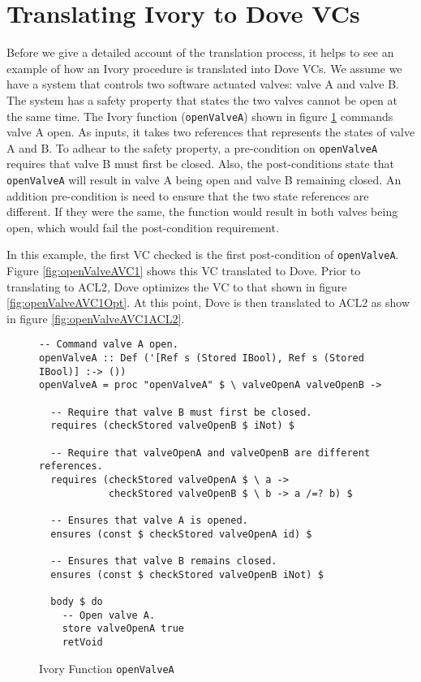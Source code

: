 \documentclass{article}
\begin{document}
\section{Translating Ivory to Dove VCs}

Before we give a detailed account of the translation process, it helps to see an 
example of how an Ivory procedure is translated into Dove VCs.
We assume we have a system that
controls two software actuated valves: valve A and valve B.
The system has a safety property that states the two valves cannot be open
at the same time.  The Ivory function (\texttt{openValveA})
shown in figure \ref{fig:openValveA} commands valve A open.
As inputs,
it takes two references that represents the states of valve A and B.
To adhear to the safety property, a pre-condition on \texttt{openValveA}
requires that valve B must first be closed.  Also, the post-conditions state
that \texttt{openValveA} will result in valve A being open and valve B remaining closed.
An addition pre-condition is need to ensure that the two state references
are different.
If they were the same, the function would result in both valves being open,
which would fail the post-condition requirement.

In this example, the first VC checked is the first post-condition
of \texttt{openValveA}.  Figure \ref{fig:openValveAVC1} shows this VC
translated to Dove.
Prior to translating to ACL2, Dove optimizes the VC
to that shown in figure \ref{fig:openValveAVC1Opt}.
At this point, Dove is then translated to ACL2 as
show in figure \ref{fig:openValveAVC1ACL2}.

\begin{figure} 
  \caption{Ivory Function \texttt{openValveA}}
  \label{fig:openValveA}
  \begin{lstlisting}
-- Command valve A open.
openValveA :: Def ('[Ref s (Stored IBool), Ref s (Stored IBool)] :-> ())
openValveA = proc "openValveA" $ \ valveOpenA valveOpenB ->

  -- Require that valve B must first be closed.
  requires (checkStored valveOpenB $ iNot) $

  -- Require that valveOpenA and valveOpenB are different references.
  requires (checkStored valveOpenA $ \ a ->
            checkStored valveOpenB $ \ b -> a /=? b) $

  -- Ensures that valve A is opened.
  ensures (const $ checkStored valveOpenA id) $

  -- Ensures that valve B remains closed.
  ensures (const $ checkStored valveOpenB iNot) $

  body $ do
    -- Open valve A.
    store valveOpenA true
    retVoid
  \end{lstlisting}
\end{figure}
\end{document}
